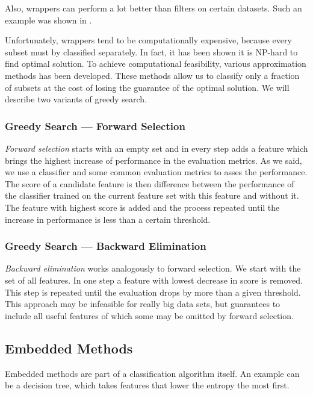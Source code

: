 Also, wrappers can perform a lot better than filters on certain datasets.
Such an example was shown in .

Unfortunately, wrappers tend to be computationally expensive,
because every subset must by classified separately.
In fact, it has been shown it is NP-hard to find optimal solution.
To achieve computational feasibility, various approximation methods has been developed.
These methods allow us to classify only a fraction of subsets
at the cost of losing the guarantee of the optimal solution.
We will describe two variants of greedy search.


\subsubsection{Greedy Search --- Forward Selection}

{\it Forward selection} starts with an empty set and in every step adds a feature which brings the highest increase of performance in the evaluation metrics.
As we said, we use a classifier and some common evaluation metrics to asses the performance.
The score of a candidate feature is then difference between the performance of the classifier trained on the current feature set with this feature and without it.
The feature with highest score is added and the process repeated until the increase in performance is less than a certain threshold. 

\subsubsection{Greedy Search --- Backward Elimination}

{\it Backward elimination} works analogously to forward selection.
We start with the set of all features.
In one step a feature with lowest decrease in score is removed.
This step is repeated until the evaluation drops by more than a given threshold.
This approach may be infeasible for really big data sets, but guarantees to include all useful features of which some may be omitted by forward selection.

\subsection{Embedded Methods}

Embedded methods are part of a classification algorithm itself.
An example can be a decision tree, which takes features that lower the entropy the most first.

